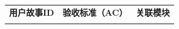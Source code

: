 \begin{levellist}
\begin{levellist}
\begin{longtable}{>{\centering\arraybackslash}m{2.3cm} >{\centering\arraybackslash}m{8.5cm} >{\centering\arraybackslash}m{4cm}}
            \multicolumn{3}{c}{{\tablename\ \thetable{} 续表}}                                                                                                                                                                                                                                                                                                                         \\
            \toprule
            \textbf{用户故事ID} & \textbf{验收标准（AC）}                                                                                                                                                                         & \textbf{关联模块}                                                                                                                                              \\
            \midrule
            \endhead

            \bottomrule
            \endfoot


\end{longtable}
\end{levellist}
\end{levellist}
